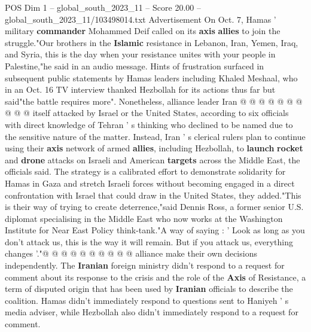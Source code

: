 \begin{textsample}{POS Dim 1 – global\_south\_2023\_11 – Score 20.00 – global\_south\_2023\_11/103498014.txt}
Advertisement On Oct. 7, Hamas ' military \textbf{commander} Mohammed Deif called on its \textbf{axis} \textbf{allies} to join the struggle."Our brothers in the \textbf{Islamic} resistance in Lebanon, Iran, Yemen, Iraq, and Syria, this is the day when your resistance unites with your people in Palestine,"he said in an audio message.
Hints of frustration surfaced in subsequent public statements by Hamas leaders including Khaled Meshaal, who in an Oct. 16 TV interview thanked Hezbollah for its actions thus far but said"the battle requires more".
Nonetheless, alliance leader Iran @ @ @ @ @ @ @ @ @ @ itself attacked by Israel or the United States, according to six officials with direct knowledge of Tehran ' s thinking who declined to be named due to the sensitive nature of the matter.
Instead, Iran ' s clerical rulers plan to continue using their \textbf{axis} network of armed \textbf{allies}, including Hezbollah, to \textbf{launch} \textbf{rocket} and \textbf{drone} attacks on Israeli and American \textbf{targets} across the Middle East, the officials said.
The strategy is a calibrated effort to demonstrate solidarity for Hamas in Gaza and stretch Israeli forces without becoming engaged in a direct confrontation with Israel that could draw in the United States, they added."This is their way of trying to create deterrence,"said Dennis Ross, a former senior U.S. diplomat specialising in the Middle East who now works at the Washington Institute for Near East Policy think-tank."A way of saying : ' Look as long as you don't attack us, this is the way it will remain.
But if you attack us, everything changes '."@ @ @ @ @ @ @ @ @ @ alliance make their own decisions independently.
The \textbf{Iranian} foreign ministry didn't respond to a request for comment about its response to the crisis and the role of the \textbf{Axis} of Resistance, a term of disputed origin that has been used by \textbf{Iranian} officials to describe the coalition.
Hamas didn't immediately respond to questions sent to Haniyeh ' s media adviser, while Hezbollah also didn't immediately respond to a request for comment.

\end{textsample}
